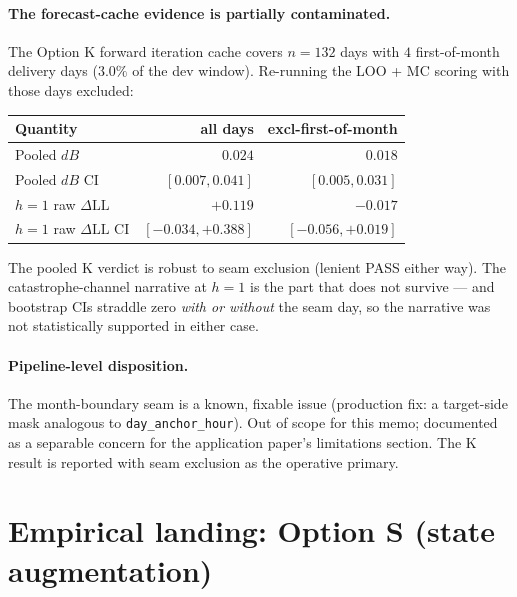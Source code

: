 \documentclass[11pt]{article}
\begin{document}
\paragraph{The forecast-cache evidence is partially contaminated.}
The Option K forward iteration cache covers \(n = 132\) days with
\(4\) first-of-month delivery days (\(3.0\%\) of the dev window).
Re-running the LOO + MC scoring with those days excluded:
\begin{center}\small
\begin{tabular}{l r r}
\toprule
Quantity & all days & excl-first-of-month \\
\midrule
Pooled \(dB\)                              & \(0.024\) & \(0.018\) \\
Pooled \(dB\) CI                           & \([0.007, 0.041]\) & \([0.005, 0.031]\) \\
\(h = 1\) raw \(\Delta\mathrm{LL}\)        & \(+0.119\) & \(-0.017\) \\
\(h = 1\) raw \(\Delta\mathrm{LL}\) CI     & \([-0.034, +0.388]\) & \([-0.056, +0.019]\) \\
\bottomrule
\end{tabular}
\end{center}
The pooled K verdict is robust to seam exclusion (lenient PASS
either way). The catastrophe-channel narrative at \(h = 1\) is the
part that does not survive --- and bootstrap CIs straddle zero
\emph{with or without} the seam day, so the narrative was not
statistically supported in either case.

\paragraph{Pipeline-level disposition.} The month-boundary seam is
a known, fixable issue (production fix: a target-side mask analogous
to \texttt{day\_anchor\_hour}). Out of scope for this memo;
documented as a separable concern for the application paper's
limitations section. The K result is reported with seam exclusion
as the operative primary.

\section{Empirical landing: Option S (state augmentation)}
\label{sec:option-s-result}
\end{document}
